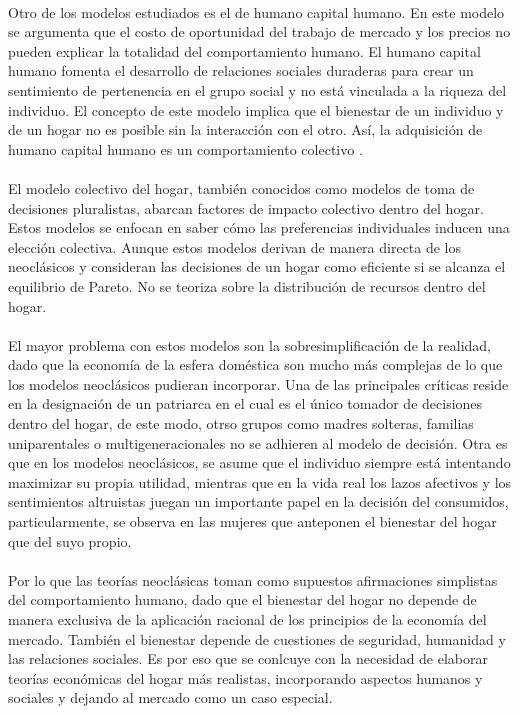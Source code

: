 \documentclass[11pt,spanish,letterpaper]{article}
\theoremstyle{plain}
\begin{document}
\\
Otro de los modelos estudiados es el de humano capital humano. En este modelo se argumenta que el costo de oportunidad del trabajo de mercado y los precios no pueden explicar la totalidad del comportamiento humano. El humano capital humano fomenta el desarrollo de relaciones sociales duraderas para crear un sentimiento de pertenencia en el grupo social y no est\'a vinculada a la riqueza del individuo. El concepto de este modelo implica que el bienestar de un individuo y de un hogar no es posible sin la interacci\'on con el otro. As\'i, la adquisici\'on de humano capital humano es un comportamiento colectivo .\\
\\
El modelo colectivo del hogar, tambi\'en conocidos como modelos de toma de decisiones pluralistas, abarcan factores de impacto colectivo dentro del hogar. Estos modelos se enfocan en saber c\'omo las preferencias individuales inducen una elecci\'on colectiva. Aunque estos modelos derivan de manera directa de los neocl\'asicos y consideran las decisiones de un hogar como eficiente si se alcanza el equilibrio de Pareto. No se teoriza sobre la distribuci\'on de recursos dentro del hogar.\\
\\
El mayor problema con estos modelos son la sobresimplificaci\'on de la realidad, dado que la econom\'ia de la esfera dom\'estica son mucho m\'as complejas de lo que los modelos neocl\'asicos pudieran incorporar. Una de las principales cr\'iticas reside en la designaci\'on de un patriarca en el cual es el \'unico tomador de decisiones dentro del hogar, de este modo, otrso grupos como madres solteras, familias uniparentales o multigeneracionales no se adhieren al modelo de decisi\'on. Otra es que en los modelos neocl\'asicos, se asume que el individuo siempre est\'a intentando maximizar su propia utilidad, mientras que en la vida real los lazos afectivos y los sentimientos altruistas juegan un importante papel en la decisi\'on del consumidos, particularmente, se observa en las mujeres que anteponen el bienestar del hogar que del suyo propio.\\
\\
Por lo que las teor\'ias neocl\'asicas toman como supuestos afirmaciones simplistas del comportamiento humano, dado que el bienestar del hogar no depende de manera exclusiva de la aplicaci\'on racional de los principios de la econom\'ia del mercado. Tambi\'en el bienestar depende de cuestiones de seguridad, humanidad y las relaciones sociales. Es por eso que se conlcuye con la necesidad de elaborar teor\'ias econ\'omicas del hogar m\'as realistas, incorporando aspectos humanos y sociales y dejando al mercado como un caso especial.


\end{document}
